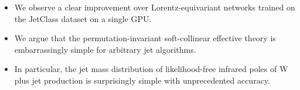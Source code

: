 \begin{itemize}
  \item We observe a clear improvement over Lorentz-equivariant networks trained on the JetClass dataset on a single GPU.
  \item We argue that the permutation-invariant soft-collinear effective theory is embarrassingly simple for arbitrary jet algorithms.
  \item In particular, the jet mass distribution of likelihood-free infrared poles of W plus jet production is surprisingly simple with unprecedented accuracy.
\end{itemize}

